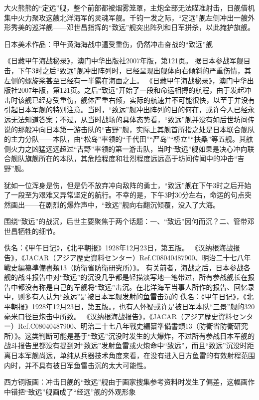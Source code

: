 \documentclass[12pt,UTF8]{ctexbook}
\begin{document}
大火熊熊的“定远”舰，整个前部都被烟雾笼罩，主炮全部无法瞄准射击，日舰借机集中火力聚攻这艘北洋海军的灵魂军舰。千钧一发之际，“定远”舰左侧冲出一艘外形秀美的巡洋舰——邓世昌指挥的“致远”舰突出阵列和日军拼杀，以此掩护旗舰。


日本美术作品：甲午黄海海战中遭受重伤，仍然冲击奋战的“致远”舰

《日藏甲午海战秘录》，澳门中华出版社2007年版，第121页。
据日本参战军舰目击，下午3时之后“致远”舰冲出阵列时，已经呈现出舰体向右倾斜的严重伤情，其左侧的螺旋桨甚至已经有一半露在海面之上。 《日藏甲午海战秘录》，澳门中华出版社2007年版，第121页。之后“致远”开始了一段和命运相搏的航程，由于发起冲击时该舰已经身受重伤，舰体严重右倾，实际的航速并不可能很快，以至于并没有引起日本军舰的特别注意。当时，“致远”舰冲出阵列的目的何在，或许今人已经永远无法知道答案；不过，从当时战场的具体态势看，“致远”舰并没有如后世坊间传说的那般冲向日本第一游击队的“吉野”舰，实际上其舰首所指之处是日本联合舰队的主力分队——本队，由“松岛”率领的“千代田”“严岛”“桥立”“扶桑”等五舰。其舷侧火力之凶猛远远超过“吉野”率领的第一游击队，当时“致远”舰如果是决心冲向联合舰队旗舰所在的本队，其危险程度和壮烈程度远远高于坊间传闻中的冲击“吉野”舰。

犹如一位浑身是伤，但是仍不放弃冲向敌阵的勇士，“致远”舰在下午3时之后开始了一段至为艰难又异常坚定的航行。不幸的是，下午3时30分左右，命运的句点突然画出——在剧烈的爆炸声中，“致远”舰向右翻沉倾覆，没入了大海。

围绕“致远”的战沉，后世主要聚焦于两个话题：一、“致远”因何而沉？二、管带邓世昌牺牲的细节。

佚名：《甲午日记》，《北平朝报》1928年12月23日，第五版。
《汉纳根海战报告》，《JACAR（アジア歴史資料センター）Ref.C08040487900、明治二十七八年戦史編纂準備書類13（防衛省防衛研究所）》。
有关前者，海战之后，日本参战各舰的战斗报告中对“致远”的沉没几乎都是轻描淡写地一笔带过，所有参战舰长在报告中都没有称是自己的军舰将“致远”击沉。在北洋海军当事人所作的报告、回忆录中，则多有人认为“致远”是被日本军舰发射的鱼雷击沉的 佚名：《甲午日记》，《北平朝报》1928年12月23日，第五版。，也有人怀疑或许是被日军本队“三景”舰的320毫米口径巨炮击中所致。 《汉纳根海战报告》，《JACAR（アジア歴史資料センター）Ref.C08040487900、明治二十七八年戦史編纂準備書類13（防衛省防衛研究所）》。这类判断可能是基于“致远”沉没时发生的大爆炸，不过所有参战日本军舰的战斗报告里都没有提到对“致远”发射鱼雷或火炮命中“致远”，而且“致远”沉没时距离日本军舰尚远，单纯从兵器技术角度来看，在没有进入日方鱼雷的有效射程范围内时，并不具有被日军鱼雷击沉的太大可能性。


西方铜版画：冲击日舰的“致远”舰由于画家搜集参考资料时发生了偏差，这幅画作中错把“致远”舰画成了“经远”舰的外观形象
\end{document}
